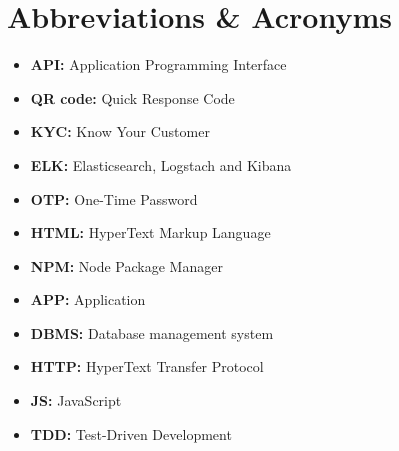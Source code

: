 \chapter*{Abbreviations \& Acronyms}

\begin{itemize}
	\item \textbf{API:}  Application Programming Interface
	\item \textbf{QR code:} Quick Response Code
	 \item \textbf{KYC:} Know Your Customer
	\item \textbf{ELK:}  Elasticsearch, Logstach and Kibana
	\item \textbf{OTP:} One-Time Password
	\item \textbf{HTML:}  HyperText Markup Language
	\item \textbf{NPM:} Node Package Manager
	\item \textbf{APP:} Application
	\item \textbf{DBMS:} Database management system
	\item \textbf{HTTP:} HyperText Transfer Protocol
	\item \textbf{JS:} JavaScript
	\item \textbf{TDD:} Test-Driven Development 
\end{itemize}